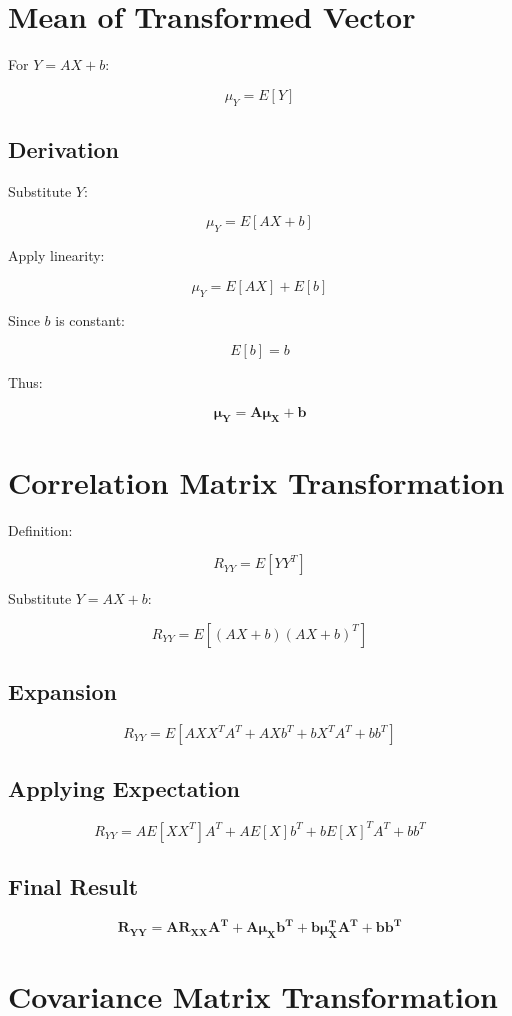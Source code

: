 \documentclass[12pt]{article}
\begin{document}
\section{Mean of Transformed Vector}

For $Y = AX + b$:

\[
\mu_Y = E[Y]
\]

\subsection{Derivation}

Substitute $Y$:

\[
\mu_Y = E[AX + b]
\]

Apply linearity:

\[
\mu_Y = E[AX] + E[b]
\]

Since $b$ is constant:

\[
E[b] = b
\]

Thus:

\[
\boxed{\mathbf{\mu_Y = A\mu_X + b}}
\]

\section{Correlation Matrix Transformation}

Definition:

\[
R_{YY} = E[YY^T]
\]

Substitute $Y = AX + b$:

\[
R_{YY} = E[(AX + b)(AX + b)^T]
\]

\subsection{Expansion}

\[
R_{YY} = E[AXX^TA^T + AXb^T + bX^TA^T + bb^T]
\]

\subsection{Applying Expectation}

\[
R_{YY} = AE[XX^T]A^T + AE[X]b^T + bE[X]^TA^T + bb^T
\]

\subsection{Final Result}

\[
\boxed{\mathbf{R_{YY} = AR_{XX}A^T + A\mu_Xb^T + b\mu_X^TA^T + bb^T}}
\]

\section{Covariance Matrix Transformation}
\end{document}
